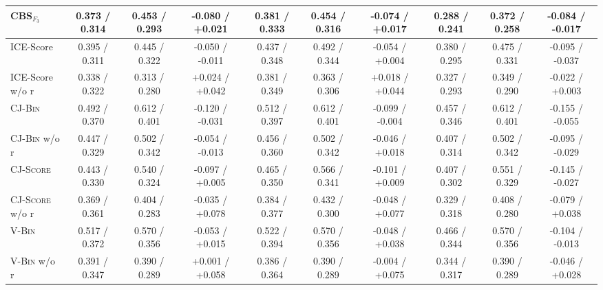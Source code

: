 \begin{table}[t]
\begin{tabular}{@{}
        l|ccc|ccc|ccc@{}}
        CBS$_{F_3}$             & 0.373 / 0.314   & 0.453 / 0.293   & -0.080 / +0.021                     & 0.381 / 0.333   & 0.454 / 0.316   & -0.074 / +0.017                     & 0.288 / 0.241   & 0.372 / 0.258   & -0.084 / -0.017                     \\
        \midrule
        \midrule
        ICE-Score               & 0.395 / 0.311   & 0.445 / 0.322   & -0.050 / -0.011                     & 0.437 / 0.348   & 0.492 / 0.344   & -0.054 / +0.004                     & 0.380 / 0.295   & 0.475 / 0.331   & -0.095 / -0.037                     \\
        ICE-Score w/o r         & 0.338 / 0.322   & 0.313 / 0.280   & +0.024 / +0.042                     & 0.381 / 0.349   & 0.363 / 0.306   & +0.018 / +0.044                     & 0.327 / 0.293   & 0.349 / 0.290   & -0.022 / +0.003                     \\
        \midrule
        \textsc{CJ-Bin}         & 0.492 / 0.370   & 0.612 / 0.401   & -0.120 / -0.031                     & 0.512 / 0.397   & 0.612 / 0.401   & -0.099 / -0.004                     & 0.457 / 0.346   & 0.612 / 0.401   & -0.155 / -0.055                     \\
        \textsc{CJ-Bin} w/o r   & 0.447 / 0.329   & 0.502 / 0.342   & -0.054 / -0.013                     & 0.456 / 0.360   & 0.502 / 0.342   & -0.046 / +0.018                     & 0.407 / 0.314   & 0.502 / 0.342   & -0.095 / -0.029                     \\
        \midrule
        \textsc{CJ-Score}       & 0.443 / 0.330   & 0.540 / 0.324   & -0.097 / +0.005                     & 0.465 / 0.350   & 0.566 / 0.341   & -0.101 / +0.009                     & 0.407 / 0.302   & 0.551 / 0.329   & -0.145 / -0.027                     \\
        \textsc{CJ-Score} w/o r & 0.369 / 0.361   & 0.404 / 0.283   & -0.035 / +0.078                     & 0.384 / 0.377   & 0.432 / 0.300   & -0.048 / +0.077                     & 0.329 / 0.318   & 0.408 / 0.280   & -0.079 / +0.038                     \\
        \midrule
        \textsc{V-Bin}          & 0.517 / 0.372   & 0.570 / 0.356   & -0.053 / +0.015                     & 0.522 / 0.394   & 0.570 / 0.356   & -0.048 / +0.038                     & 0.466 / 0.344   & 0.570 / 0.356   & -0.104 / -0.013                     \\
        \textsc{V-Bin} w/o r    & 0.391 / 0.347   & 0.390 / 0.289   & +0.001 / +0.058                     & 0.386 / 0.364   & 0.390 / 0.289   & -0.004 / +0.075                     & 0.344 / 0.317   & 0.390 / 0.289   & -0.046 / +0.028                     \\

\end{tabular}
\end{table}
